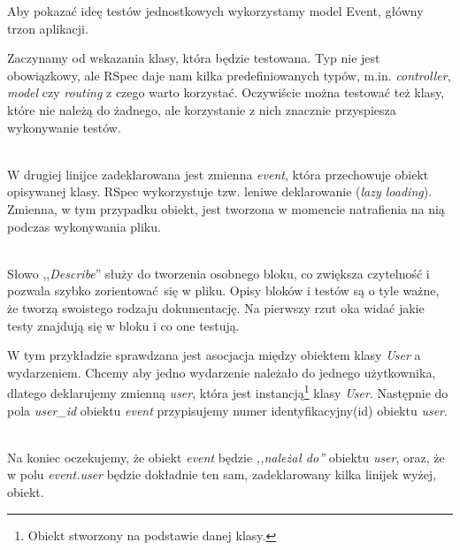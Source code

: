 Aby pokazać ideę testów jednostkowych wykorzystamy model Event, główny trzon aplikacji.

Zaczynamy od wskazania klasy, która będzie testowana. Typ nie jest obowiązkowy, ale RSpec daje nam kilka predefiniowanych typów, m.in. \emph{controller}, \emph{model} czy \emph{routing} z czego warto korzystać. Oczywiście można testować też klasy, które nie należą do żadnego, ale korzystanie z nich znacznie przyspiesza wykonywanie testów.

\begin{code}
	
\end{code}\\

W drugiej linijce zadeklarowana jest zmienna \emph{event}, która przechowuje obiekt opisywanej klasy. RSpec wykorzystuje tzw. leniwe deklarowanie (\emph{lazy loading}). Zmienna, w tym przypadku obiekt, jest tworzona w momencie natrafienia na nią podczas wykonywania pliku.

\begin{code}
	
\end{code}\\

Słowo ,,\emph{Describe}'' służy do tworzenia osobnego bloku, co zwiększa czytelność i pozwala szybko zorientować się w pliku. Opisy bloków i testów są o tyle ważne, że tworzą swoistego rodzaju dokumentację. Na pierwszy rzut oka widać jakie testy znajdują się w bloku i co one testują.

W tym przykładzie sprawdzana jest asocjacja między obiektem klasy \emph{User} a wydarzeniem. Chcemy aby jedno wydarzenie należało do jednego użytkownika, dlatego deklarujemy zmienną \emph{user}, która jest instancją\footnote{Obiekt stworzony na podstawie danej klasy.} klasy \emph{User}. Następnie do pola \emph{user\_id} obiektu \emph{event} przypisujemy numer identyfikacyjny(id) obiektu \emph{user}.

\begin{code}
	
\end{code}\\

Na koniec oczekujemy, że obiekt \emph{event} będzie \emph{,,należał do''} obiektu \emph{user}, oraz, że w polu \emph{event.user} będzie dokładnie ten sam, zadeklarowany kilka linijek wyżej, obiekt.

